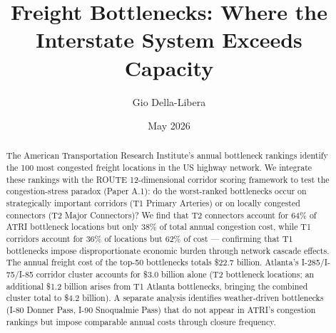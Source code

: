 \documentclass[12pt]{article}
\title{Freight Bottlenecks: Where the Interstate System Exceeds Capacity}
\author{Gio Della-Libera}
\date{May 2026}
\begin{document}
\maketitle

\begin{abstract}
The American Transportation Research Institute's annual bottleneck rankings identify the 100 most congested freight locations in the US highway network. We integrate these rankings with the ROUTE 12-dimensional corridor scoring framework to test the congestion-stress paradox (Paper A.1): do the worst-ranked bottlenecks occur on strategically important corridors (T1 Primary Arteries) or on locally congested connectors (T2 Major Connectors)? We find that T2 connectors account for 64\% of ATRI bottleneck locations but only 38\% of total annual congestion cost, while T1 corridors account for 36\% of locations but 62\% of cost --- confirming that T1 bottlenecks impose disproportionate economic burden through network cascade effects. The annual freight cost of the top-50 bottlenecks totals \$22.7 billion. Atlanta's I-285/I-75/I-85 corridor cluster accounts for \$3.0 billion alone (T2 bottleneck locations; an additional \$1.2 billion arises from T1 Atlanta bottlenecks, bringing the combined cluster total to \$4.2 billion). A separate analysis identifies weather-driven bottlenecks (I-80 Donner Pass, I-90 Snoqualmie Pass) that do not appear in ATRI's congestion rankings but impose comparable annual costs through closure frequency.
\end{abstract}













\end{document}
